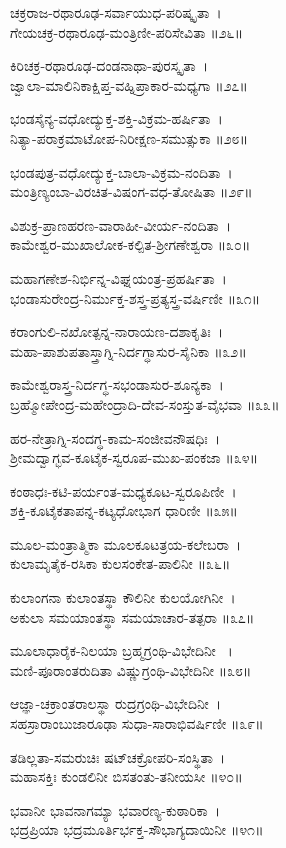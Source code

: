 ಚಕ್ರರಾಜ-ರಥಾರೂಢ-ಸರ್ವಾಯುಧ-ಪರಿಷ್ಕೃತಾ~।\\
ಗೇಯಚಕ್ರ-ರಥಾರೂಢ-ಮಂತ್ರಿಣೀ-ಪರಿಸೇವಿತಾ ॥೨೬॥

ಕಿರಿಚಕ್ರ-ರಥಾರೂಢ-ದಂಡನಾಥಾ-ಪುರಸ್ಕೃತಾ~।\\
ಜ್ವಾಲಾ-ಮಾಲಿನಿಕಾಕ್ಷಿಪ್ತ-ವಹ್ನಿಪ್ರಾಕಾರ-ಮಧ್ಯಗಾ ॥೨೭॥

ಭಂಡಸೈನ್ಯ-ವಧೋದ್ಯುಕ್ತ-ಶಕ್ತಿ-ವಿಕ್ರಮ-ಹರ್ಷಿತಾ~।\\
ನಿತ್ಯಾ-ಪರಾಕ್ರಮಾಟೋಪ-ನಿರೀಕ್ಷಣ-ಸಮುತ್ಸುಕಾ ॥೨೮॥

ಭಂಡಪುತ್ರ-ವಧೋದ್ಯುಕ್ತ-ಬಾಲಾ-ವಿಕ್ರಮ-ನಂದಿತಾ~।\\
ಮಂತ್ರಿಣ್ಯಂಬಾ-ವಿರಚಿತ-ವಿಷಂಗ-ವಧ-ತೋಷಿತಾ ॥೨೯॥

ವಿಶುಕ್ರ-ಪ್ರಾಣಹರಣ-ವಾರಾಹೀ-ವೀರ್ಯ-ನಂದಿತಾ~।\\
ಕಾಮೇಶ್ವರ-ಮುಖಾಲೋಕ-ಕಲ್ಪಿತ-ಶ್ರೀಗಣೇಶ್ವರಾ ॥೩೦॥

ಮಹಾಗಣೇಶ-ನಿರ್ಭಿನ್ನ-ವಿಘ್ನಯಂತ್ರ-ಪ್ರಹರ್ಷಿತಾ~।\\
ಭಂಡಾಸುರೇಂದ್ರ-ನಿರ್ಮುಕ್ತ-ಶಸ್ತ್ರ-ಪ್ರತ್ಯಸ್ತ್ರ-ವರ್ಷಿಣೀ ॥೩೧॥

ಕರಾಂಗುಲಿ-ನಖೋತ್ಪನ್ನ-ನಾರಾಯಣ-ದಶಾಕೃತಿಃ~।\\
ಮಹಾ-ಪಾಶುಪತಾಸ್ತ್ರಾಗ್ನಿ-ನಿರ್ದಗ್ಧಾಸುರ-ಸೈನಿಕಾ ॥೩೨॥

ಕಾಮೇಶ್ವರಾಸ್ತ್ರ-ನಿರ್ದಗ್ಧ-ಸಭಂಡಾಸುರ-ಶೂನ್ಯಕಾ~।\\
ಬ್ರಹ್ಮೋಪೇಂದ್ರ-ಮಹೇಂದ್ರಾದಿ-ದೇವ-ಸಂಸ್ತುತ-ವೈಭವಾ ॥೩೩॥

ಹರ-ನೇತ್ರಾಗ್ನಿ-ಸಂದಗ್ಧ-ಕಾಮ-ಸಂಜೀವನೌಷಧಿಃ~।\\
ಶ್ರೀಮದ್ವಾಗ್ಭವ-ಕೂಟೈಕ-ಸ್ವರೂಪ-ಮುಖ-ಪಂಕಜಾ ॥೩೪॥

ಕಂಠಾಧಃ-ಕಟಿ-ಪರ್ಯಂತ-ಮಧ್ಯಕೂಟ-ಸ್ವರೂಪಿಣೀ~।\\
ಶಕ್ತಿ-ಕೂಟೈಕತಾಪನ್ನ-ಕಟ್ಯಧೋಭಾಗ ಧಾರಿಣೀ ॥೩೫॥

ಮೂಲ-ಮಂತ್ರಾತ್ಮಿಕಾ ಮೂಲಕೂಟತ್ರಯ-ಕಲೇಬರಾ~।\\
ಕುಲಾಮೃತೈಕ-ರಸಿಕಾ ಕುಲಸಂಕೇತ-ಪಾಲಿನೀ ॥೩೬॥

ಕುಲಾಂಗನಾ ಕುಲಾಂತಸ್ಥಾ ಕೌಲಿನೀ ಕುಲಯೋಗಿನೀ~।\\
ಅಕುಲಾ ಸಮಯಾಂತಸ್ಥಾ ಸಮಯಾಚಾರ-ತತ್ಪರಾ ॥೩೭॥

ಮೂಲಾಧಾರೈಕ-ನಿಲಯಾ ಬ್ರಹ್ಮಗ್ರಂಥಿ-ವಿಭೇದಿನೀ ~।\\
ಮಣಿ-ಪೂರಾಂತರುದಿತಾ ವಿಷ್ಣುಗ್ರಂಥಿ-ವಿಭೇದಿನೀ ॥೩೮॥

ಆಜ್ಞಾ-ಚಕ್ರಾಂತರಾಲಸ್ಥಾ ರುದ್ರಗ್ರಂಥಿ-ವಿಭೇದಿನೀ~।\\
ಸಹಸ್ರಾರಾಂಬುಜಾರೂಢಾ ಸುಧಾ-ಸಾರಾಭಿವರ್ಷಿಣೀ ॥೩೯॥

ತಡಿಲ್ಲತಾ-ಸಮರುಚಿಃ ಷಟ್‍ಚಕ್ರೋಪರಿ-ಸಂಸ್ಥಿತಾ~।\\
ಮಹಾಸಕ್ತಿಃ ಕುಂಡಲಿನೀ ಬಿಸತಂತು-ತನೀಯಸೀ ॥೪೦॥

ಭವಾನೀ ಭಾವನಾಗಮ್ಯಾ ಭವಾರಣ್ಯ-ಕುಠಾರಿಕಾ~।\\
ಭದ್ರಪ್ರಿಯಾ ಭದ್ರಮೂರ್ತಿರ್ಭಕ್ತ-ಸೌಭಾಗ್ಯದಾಯಿನೀ ॥೪೧॥

